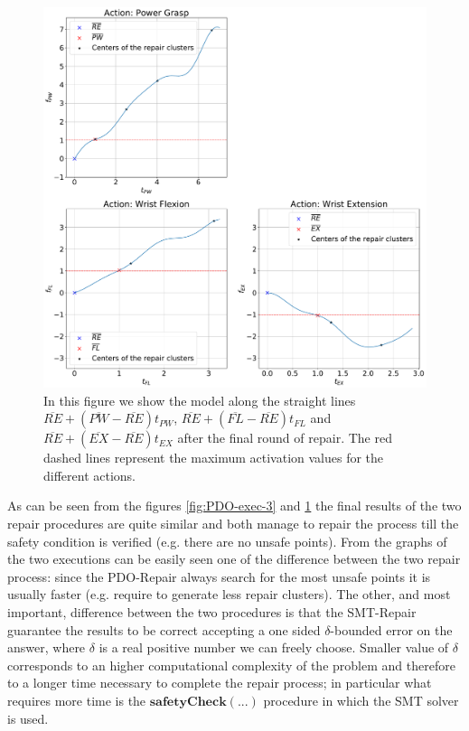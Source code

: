 \begin{figure}[H]
    \centering
    \includegraphics[width=\textwidth]{Images/repair-example/SMT-State4.pdf}
    \caption{In this figure we show the model along the straight lines $\overline{RE} + (\overline{PW} - \overline{RE})t_{PW}$, $\overline{RE} + (\overline{FL} - \overline{RE})t_{FL}$ and $\overline{RE} + (\overline{EX} - \overline{RE})t_{EX}$ after the final round of repair. The red dashed lines represent the maximum activation values for the different actions.}
    \label{fig:SMT-exec-4}
\end{figure}
As can be seen from the figures \ref{fig:PDO-exec-3} and \ref{fig:SMT-exec-4} the final results of the two repair procedures are quite similar and both manage to repair the process till the safety condition is verified (e.g. there are no unsafe points). From the graphs of the two executions can be easily seen one of the difference between the two repair process: since the PDO-Repair always search for the most unsafe points it is usually faster (e.g. require to generate less repair clusters). The other, and most important, difference between the two procedures is that the SMT-Repair guarantee the results to be correct accepting a one sided $\delta$-bounded error on the answer, where $\delta$ is a real positive number we can freely choose. Smaller value of $\delta$ corresponds to an higher computational complexity of the problem and therefore to a longer time necessary to complete the repair process; in particular what requires more time is the $\mathbf{safetyCheck(...)}$ procedure in which the SMT solver is used.
